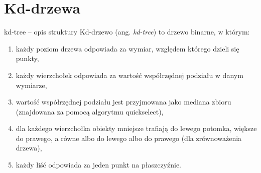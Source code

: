 \documentclass[aspectratio=169,dvipsnames]{beamer}
\begin{document}
\section{Kd-drzewa}

\begin{frame}{kd-tree -- opis struktury}
    Kd-drzewo (ang. \textit{kd-tree}) to drzewo binarne, w którym:
    \begin{enumerate}
        \item<2-> każdy poziom drzewa odpowiada za wymiar, względem którego dzieli się punkty,
        \item<3-> każdy wierzchołek odpowiada za wartość współrzędnej podziału w danym wymiarze,
        \item<4-> wartość współrzędnej podziału jest przyjmowana jako mediana zbioru (znajdowana za pomocą algorytmu quickselect),
        \item<5-> dla każdego wierzchołka obiekty mniejsze trafiają do lewego potomka, większe do prawego, a równe albo do lewego albo do prawego (dla zrównoważenia drzewa),
        \item<6-> każdy liść odpowiada za jeden punkt na płaszczyźnie.
    \end{enumerate}
\end{frame}
\end{document}
